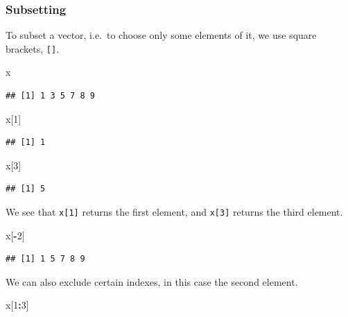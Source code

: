 \documentclass[]{book}
\newenvironment{Shaded}{\begin{snugshade}}{\end{snugshade}}
\newcommand{\DecValTok}[1]{\textcolor[rgb]{0.00,0.00,0.81}{#1}}
\newcommand{\OperatorTok}[1]{\textcolor[rgb]{0.81,0.36,0.00}{\textbf{#1}}}
\newcommand{\NormalTok}[1]{#1}
\theoremstyle{definition}
\theoremstyle{definition}
\theoremstyle{definition}
\theoremstyle{remark}
\begin{document}
\subsubsection{Subsetting}\label{subsetting}

To subset a vector, i.e.~to choose only some elements of it, we use
square brackets, \texttt{{[}{]}}.

\begin{Shaded}
\begin{Highlighting}[]
\NormalTok{x}
\end{Highlighting}
\end{Shaded}

\begin{verbatim}
## [1] 1 3 5 7 8 9
\end{verbatim}

\begin{Shaded}
\begin{Highlighting}[]
\NormalTok{x[}\DecValTok{1}\NormalTok{]}
\end{Highlighting}
\end{Shaded}

\begin{verbatim}
## [1] 1
\end{verbatim}

\begin{Shaded}
\begin{Highlighting}[]
\NormalTok{x[}\DecValTok{3}\NormalTok{]}
\end{Highlighting}
\end{Shaded}

\begin{verbatim}
## [1] 5
\end{verbatim}

We see that \texttt{x{[}1{]}} returns the first element, and
\texttt{x{[}3{]}} returns the third element.

\begin{Shaded}
\begin{Highlighting}[]
\NormalTok{x[}\OperatorTok{-}\DecValTok{2}\NormalTok{]}
\end{Highlighting}
\end{Shaded}

\begin{verbatim}
## [1] 1 5 7 8 9
\end{verbatim}

We can also exclude certain indexes, in this case the second element.

\begin{Shaded}
\begin{Highlighting}[]
\NormalTok{x[}\DecValTok{1}\OperatorTok{:}\DecValTok{3}\NormalTok{]}
\end{Highlighting}
\end{Shaded}
\end{document}
